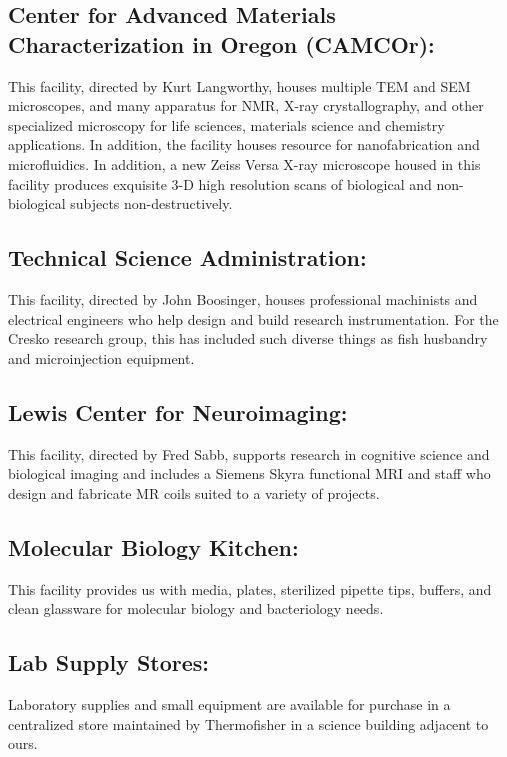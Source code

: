\documentclass[
]{book}
\begin{document}
\hypertarget{center-for-advanced-materials-characterization-in-oregon-camcor}{%
\subsection{Center for Advanced Materials Characterization in Oregon (CAMCOr):}\label{center-for-advanced-materials-characterization-in-oregon-camcor}}

This facility, directed by Kurt Langworthy, houses multiple TEM and SEM microscopes, and many apparatus for NMR, X-ray crystallography, and other specialized microscopy for life sciences, materials science and chemistry applications. In addition, the facility houses resource for nanofabrication and microfluidics. In addition, a new Zeiss Versa X-ray microscope housed in this facility produces exquisite 3-D high resolution scans of biological and non-biological subjects non-destructively.

\hypertarget{technical-science-administration}{%
\subsection{Technical Science Administration:}\label{technical-science-administration}}

This facility, directed by John Boosinger, houses professional machinists and electrical engineers who help design and build research instrumentation. For the Cresko research group, this has included such diverse things as fish husbandry and microinjection equipment.

\hypertarget{lewis-center-for-neuroimaging}{%
\subsection{Lewis Center for Neuroimaging:}\label{lewis-center-for-neuroimaging}}

This facility, directed by Fred Sabb, supports research in cognitive science and biological imaging and includes a Siemens Skyra functional MRI and staff who design and fabricate MR coils suited to a variety of projects.

\hypertarget{molecular-biology-kitchen}{%
\subsection{Molecular Biology Kitchen:}\label{molecular-biology-kitchen}}

This facility provides us with media, plates, sterilized pipette tips, buffers, and clean glassware for molecular biology and bacteriology needs.

\hypertarget{lab-supply-stores}{%
\subsection{Lab Supply Stores:}\label{lab-supply-stores}}

Laboratory supplies and small equipment are available for purchase in a centralized store maintained by Thermofisher in a science building adjacent to ours.

  
\end{document}
